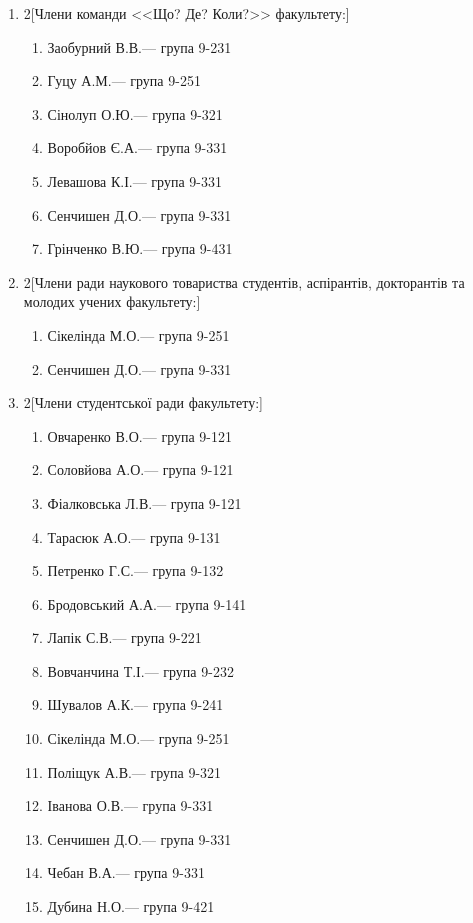 \documentclass[
	a4paper,
	12pt,
	oneside,
	draft
]{extreport}
\begin{document}
{\begin{enumerate}[label=\Roman*.]
\item \begin{multicols}{2}[Члени команди <<Що? Де? Коли?>> факультету:]
\begin{enumerate}[topsep=0pt,itemsep=-1ex,partopsep=1ex,parsep=1ex,label=\arabic*.]
\item Заобурний В.В.\hfill --- група 9-231
\item Гуцу А.М.\hfill --- група 9-251
\item Сінолуп О.Ю.\hfill --- група 9-321
\item Воробйов Є.А.\hfill --- група 9-331
\item Левашова К.І.\hfill --- група 9-331
\item Сенчишен Д.О.\hfill --- група 9-331
\item Грінченко В.Ю.\hfill --- група 9-431
\end{enumerate}
\end{multicols}


\item \begin{multicols}{2}[Члени ради наукового товариства студентів, аспірантів, докторантів та молодих учених факультету:]
\begin{enumerate}[topsep=0pt,itemsep=-1ex,partopsep=1ex,parsep=1ex,label=\arabic*.]
\item Сікелінда М.О.\hfill --- група 9-251
\item Сенчишен Д.О.\hfill --- група 9-331
\end{enumerate}
\end{multicols}


\item \begin{multicols}{2}[Члени студентської ради факультету:]
\begin{enumerate}[topsep=0pt,itemsep=-1ex,partopsep=1ex,parsep=1ex,label=\arabic*.]
\item Овчаренко В.О.\hfill --- група 9-121
\item Соловйова А.О.\hfill --- група 9-121
\item Фіалковська Л.В.\hfill --- група 9-121
\item Тарасюк А.О.\hfill --- група 9-131
\item Петренко Г.С.\hfill --- група 9-132
\item Бродовський А.А.\hfill --- група 9-141
\item Лапік С.В.\hfill --- група 9-221
\item Вовчанчина Т.І.\hfill --- група 9-232
\item Шувалов А.К.\hfill --- група 9-241
\item Сікелінда М.О.\hfill --- група 9-251
\item Поліщук А.В.\hfill --- група 9-321
\item Іванова О.В.\hfill --- група 9-331
\item Сенчишен Д.О.\hfill --- група 9-331
\item Чебан В.А.\hfill --- група 9-331
\item Дубина Н.О.\hfill --- група 9-421
\end{enumerate}
\end{multicols}


\end{enumerate}}
\end{document}
